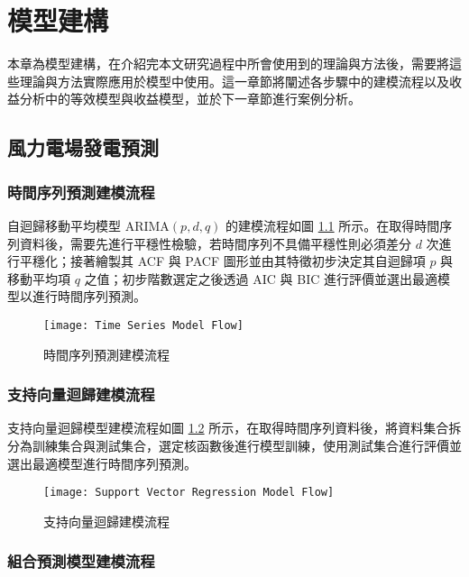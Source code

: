 
\chapter{模型建構}

本章為模型建構，在介紹完本文研究過程中所會使用到的理論與方法後，需要將這些理論與方法實際應用於模型中使用。這一章節將闡述各步驟中的建模流程以及收益分析中的等效模型與收益模型，並於下一章節進行案例分析。

\section{風力電場發電預測}

\subsection{時間序列預測建模流程}

自迴歸移動平均模型 $\text{ARIMA}(p, d, q)$ 的建模流程如圖 \ref{figure: Time Series Model Flow} 所示。在取得時間序列資料後，需要先進行平穩性檢驗，若時間序列不具備平穩性則必須差分 $d$ 次進行平穩化；接著繪製其 ACF 與 PACF 圖形並由其特徵初步決定其自迴歸項 $p$ 與移動平均項 $q$ 之值；初步階數選定之後透過 AIC 與 BIC 進行評價並選出最適模型以進行時間序列預測。

\begin{figure}[htbp]
  \centering
  \texttt{[image: Time Series Model Flow]}
  \caption{時間序列預測建模流程}
  \label{figure: Time Series Model Flow}
\end{figure}

\subsection{支持向量迴歸建模流程}

支持向量迴歸模型建模流程如圖 \ref{figure: Support Vector Regression Flow} 所示，在取得時間序列資料後，將資料集合拆分為訓練集合與測試集合，選定核函數後進行模型訓練，使用測試集合進行評價並選出最適模型進行時間序列預測。

\begin{figure}[htbp]
  \centering
  \texttt{[image: Support Vector Regression Model Flow]}
  \caption{支持向量迴歸建模流程}
  \label{figure: Support Vector Regression Flow}
\end{figure}

\subsection{組合預測模型建模流程}

